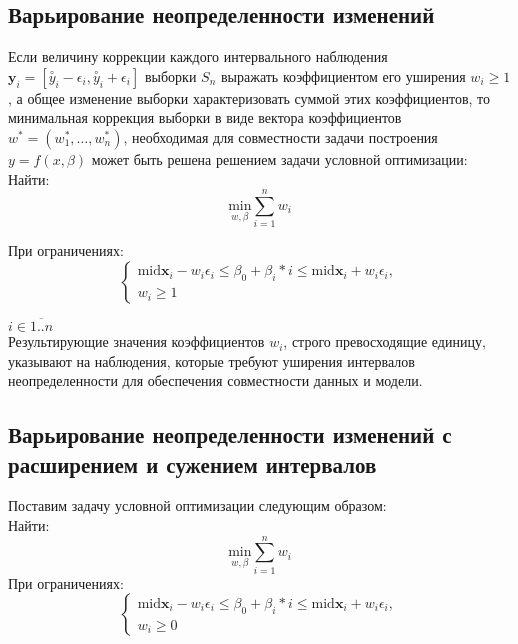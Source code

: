 \subsection{Варьирование неопределенности изменений} 

Если величину коррекции каждого интервального наблюдения $\bm{y}_i = [\stackrel{\circ}{y}_i - \epsilon_i, \stackrel{\circ}{y}_i + \epsilon_i]$ выборки $S_n$ выражать коэффициентом его уширения $w_i \geq 1$, а общее изменение выборки характеризовать суммой этих коэффициентов, то минимальная коррекция выборки в виде вектора коэффициентов $w^* = (w_{1}^*, \ldots, w_{n}^{*})$, необходимая для совместности задачи построения $y=f(x, \beta)$ может быть решена решением задачи условной оптимизации: \\

Найти: \\
\begin{equation} \label{eq:lin_opt_task}
	\underset {w, \beta}{\text{min}} \sum\limits_{i=1}^{n} w_i
\end{equation}

При ограничениях: \\

\begin{equation} \label{eq:lin_opt_boundaries}
	\begin{cases}
		\text{mid} \bm{x}_i - w_i \epsilon_i \leq \beta_0 + \beta_i * i \leq \text{mid} \bm{x}_i + w_i \epsilon_i, \\
		w_i \geq 1 
	\end{cases}
\end{equation}

$i \in \overline{1..n}$ \\

Результирующие значения коэффициентов $w_i$, строго превосходящие единицу, указывают на наблюдения, которые требуют уширения интервалов неопределенности для обеспечения совместности данных и модели. \\

\subsection{Варьирование неопределенности изменений с расширением и сужением интервалов} 

Поставим задачу условной оптимизации следующим образом:\\
Найти: \\
\begin{equation} \label{eq:lin_opt_pos_task}
	\underset {w, \beta}{\text{min}} \sum\limits_{i=1}^{n} w_i
\end{equation}
При ограничениях: \\
\begin{equation} \label{eq:lin_opt_pos_boundaries}
	\begin{cases}
		\text{mid} \bm{x}_i - w_i \epsilon_i \leq \beta_0 + \beta_i * i \leq \text{mid} \bm{x}_i + w_i \epsilon_i, \\
		w_i \geq 0 
	\end{cases}
\end{equation}

